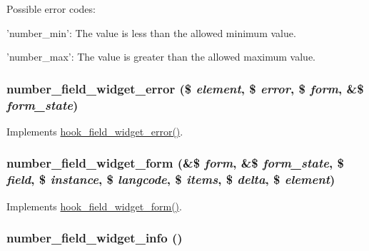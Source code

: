Possible error codes:
\begin{DoxyItemize}
\item 'number\_\-min': The value is less than the allowed minimum value.
\item 'number\_\-max': The value is greater than the allowed maximum value. 
\end{DoxyItemize}\hypertarget{number_8module_a7c084f833f08a44f5de81e135a447955}{
\subsubsection[{number\_\-field\_\-widget\_\-error}]{\setlength{\rightskip}{0pt plus 5cm}number\_\-field\_\-widget\_\-error (\$ {\em element}, \/  \$ {\em error}, \/  \$ {\em form}, \/  \&\$ {\em form\_\-state})}}
\label{number_8module_a7c084f833f08a44f5de81e135a447955}
Implements \hyperlink{group__field__widget_ga9a2031578542fef9e296d79c946431fd}{hook\_\-field\_\-widget\_\-error()}. \hypertarget{number_8module_ab84d799cde19aca21bb03a24405d299d}{
\subsubsection[{number\_\-field\_\-widget\_\-form}]{\setlength{\rightskip}{0pt plus 5cm}number\_\-field\_\-widget\_\-form (\&\$ {\em form}, \/  \&\$ {\em form\_\-state}, \/  \$ {\em field}, \/  \$ {\em instance}, \/  \$ {\em langcode}, \/  \$ {\em items}, \/  \$ {\em delta}, \/  \$ {\em element})}}
\label{number_8module_ab84d799cde19aca21bb03a24405d299d}
Implements \hyperlink{group__field__widget_gaa9b0e55fd0eb57ac0f9c7c30d251971b}{hook\_\-field\_\-widget\_\-form()}. \hypertarget{number_8module_a799dffc561bbf06c81daff818fcf1b2b}{
\subsubsection[{number\_\-field\_\-widget\_\-info}]{\setlength{\rightskip}{0pt plus 5cm}number\_\-field\_\-widget\_\-info ()}}
